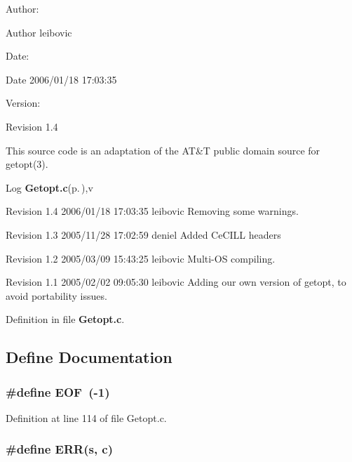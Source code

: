 \begin{Desc}
\item[Author:]\begin{Desc}
\item[Author]leibovic \end{Desc}
\end{Desc}
\begin{Desc}
\item[Date:]\begin{Desc}
\item[Date]2006/01/18 17:03:35 \end{Desc}
\end{Desc}
\begin{Desc}
\item[Version:]\begin{Desc}
\item[Revision]1.4 \end{Desc}
\end{Desc}
This source code is an adaptation of the AT\&T public domain source for getopt(3).

\begin{Desc}
\item[Log]{\bf Getopt.c}{\rm (p.\,\pageref{Getopt_8c})},v \end{Desc}
Revision 1.4 2006/01/18 17:03:35 leibovic Removing some warnings.

Revision 1.3 2005/11/28 17:02:59 deniel Added Ce\-CILL headers

Revision 1.2 2005/03/09 15:43:25 leibovic Multi-OS compiling.

Revision 1.1 2005/02/02 09:05:30 leibovic Adding our own version of getopt, to avoid portability issues.

Definition in file {\bf Getopt.c}.

\subsection{Define Documentation}
\subsubsection{\setlength{\rightskip}{0pt plus 5cm}\#define EOF\ (-1)}\label{Getopt_8c_a1}




Definition at line 114 of file Getopt.c.
\subsubsection{\setlength{\rightskip}{0pt plus 5cm}\#define ERR(s, c)}\label{Getopt_8c_a2}


